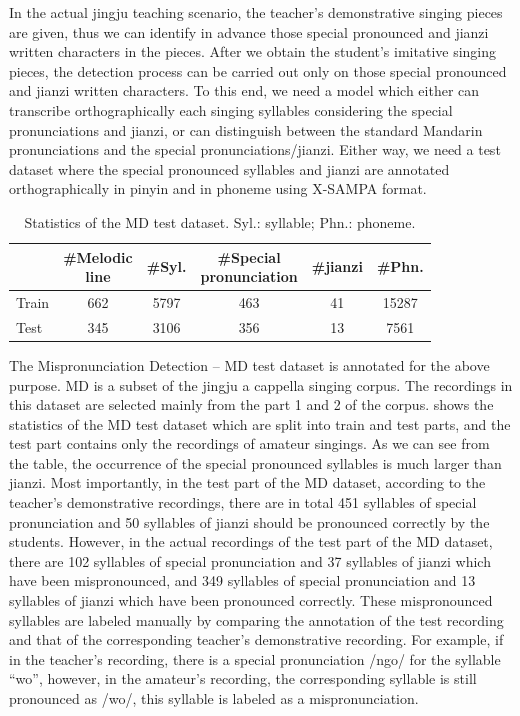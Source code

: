 In the actual jingju teaching scenario, the teacher's demonstrative singing pieces are given, thus we can identify in advance those special pronounced and \gls{jianzi} written characters in the pieces. After we obtain the student's imitative singing pieces, the detection process can be carried out only on those special pronounced and \gls{jianzi} written characters. To this end, we need a model which either can transcribe orthographically each singing syllables considering the special pronunciations and \gls{jianzi}, or can distinguish between the standard Mandarin pronunciations and the special pronunciations/\gls{jianzi}. Either way, we need a test dataset where the special pronounced syllables and \gls{jianzi} are annotated orthographically in pinyin and in phoneme using X-SAMPA format.

\begin{table}[ht]
    \centering
    \caption{Statistics of the MD test dataset. Syl.: syllable; Phn.: phoneme.}
    \label{table:ch4:detailInfoDataset_md}
    \begin{tabular}{l|ccccc}
        \toprule
        & \makecell{\#Melodic\\line} & \#Syl. & \makecell{\#Special\\pronunciation} & \#jianzi & \#Phn. \\
        \midrule
        Train           & 662 & 5797 & 463 & 41 & 15287 \\
        Test               & 345 & 3106 & 356 & 13 & 7561 \\
        \bottomrule
    \end{tabular}
\end{table}

The Mispronunciation Detection -- MD test dataset is annotated for the above purpose. MD is a subset of the jingju a cappella singing corpus. The recordings in this dataset are selected mainly from the part 1 and 2 of the corpus.  shows the statistics of the MD test dataset which are split into train and test parts, and the test part contains only the recordings of amateur singings. As we can see from the table, the occurrence of the special pronounced syllables is much larger than \gls{jianzi}. Most importantly, in the test part of the MD dataset, according to the teacher's demonstrative recordings, there are in total 451 syllables of special pronunciation and 50 syllables of \gls{jianzi} should be pronounced correctly by the students. However, in the actual recordings of the test part of the MD dataset, there are 102 syllables of special pronunciation and 37 syllables of \gls{jianzi} which have been mispronounced, and 349 syllables of special pronunciation and 13 syllables of \gls{jianzi} which have been pronounced correctly. These mispronounced syllables are labeled manually by comparing the annotation of the test recording and that of the corresponding teacher's demonstrative recording. For example, if in the teacher's recording, there is a special pronunciation /ngo/ for the syllable ``wo”, however, in the amateur's recording, the corresponding syllable is still pronounced as /wo/, this syllable is labeled as a mispronunciation.


